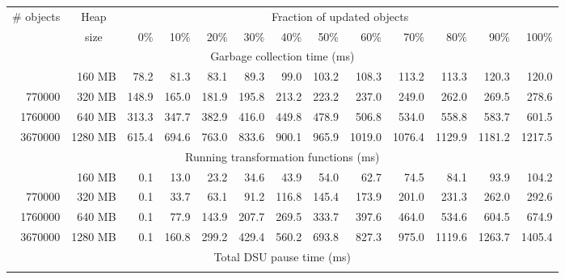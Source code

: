 \begin{table*}[t]
\begin{footnotesize}
\begin{center}
\begin{tabular}{|r|r|rrrrrrrrrrr|}
                                                                                                                                   \hline
\multirow{2}{*}{\# objects}     & \multicolumn{1}{c}{Heap}   & \multicolumn{11}{|c|}{Fraction of updated objects \T}            \\
                                & \multicolumn{1}{c|}{size}  &
                       0\%  &   10\%  &   20\%  &   30\%  &   40\%  &   50\%  &   60\%  &   70\%  &   80\%  &   90\%  &  100\%  \\ \hline
\multicolumn{13}{|c|}{Garbage collection time (ms) \T}                                                                          \\ \hline \T
 280000 &  160 MB &    78.2 &    81.3 &    83.1 &    89.3 &    99.0 &   103.2 &   108.3 &   113.2 &   113.3 &   120.3 &   120.0 \\
 770000 &  320 MB &   148.9 &   165.0 &   181.9 &   195.8 &   213.2 &   223.2 &   237.0 &   249.0 &   262.0 &   269.5 &   278.6 \\
1760000 &  640 MB &   313.3 &   347.7 &   382.9 &   416.0 &   449.8 &   478.9 &   506.8 &   534.0 &   558.8 &   583.7 &   601.5 \\
3670000 & 1280 MB &   615.4 &   694.6 &   763.0 &   833.6 &   900.1 &   965.9 &  1019.0 &  1076.4 &  1129.9 &  1181.2 &  1217.5 \\ \hline
\multicolumn{13}{|c|}{Running transformation functions (ms) \T}                                                                 \\ \hline \T
 280000 &  160 MB &     0.1 &    13.0 &    23.2 &    34.6 &    43.9 &    54.0 &    62.7 &    74.5 &    84.1 &    93.9 &   104.2 \\
 770000 &  320 MB &     0.1 &    33.7 &    63.1 &    91.2 &   116.8 &   145.4 &   173.9 &   201.0 &   231.3 &   262.0 &   292.6 \\
1760000 &  640 MB &     0.1 &    77.9 &   143.9 &   207.7 &   269.5 &   333.7 &   397.6 &   464.0 &   534.6 &   604.5 &   674.9 \\
3670000 & 1280 MB &     0.1 &   160.8 &   299.2 &   429.4 &   560.2 &   693.8 &   827.3 &   975.0 &  1119.6 &  1263.7 &  1405.4 \\ \hline
\multicolumn{13}{|c|}{Total DSU pause time (ms) \T}                                                                             \\ \hline \T

\end{tabular}
\end{center}
\end{footnotesize}
\end{table*}
